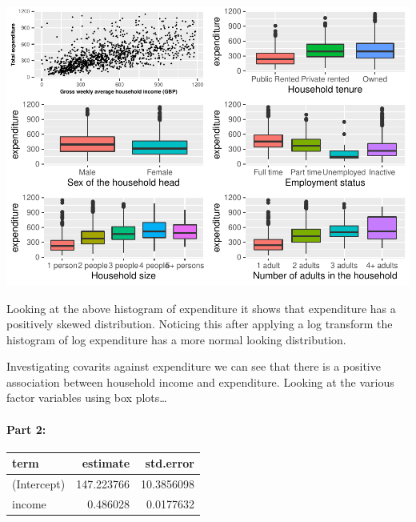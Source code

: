 \documentclass[
]{article}
\begin{document}
\includegraphics{Draft_1_files/figure-latex/unnamed-chunk-3-2.pdf}

Looking at the above histogram of expenditure it shows that expenditure
has a positively skewed distribution. Noticing this after applying a log
transform the histogram of log expenditure has a more normal looking
distribution.

Investigating covarits against expenditure we can see that there is a
positive association between household income and expenditure. Looking
at the various factor variables using box plots\ldots{}

\hypertarget{part-2}{%
\paragraph{Part 2:}\label{part-2}}

\begin{table}
\centering\begingroup\fontsize{15}{17}\selectfont

\begin{tabular}{l|r|r}
\hline
term & estimate & std.error\\
\hline
(Intercept) & 147.223766 & 10.3856098\\
\hline
income & 0.486028 & 0.0177632\\
\hline
\end{tabular}
\endgroup{}
\end{table}
\end{document}
